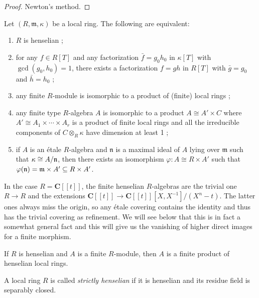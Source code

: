 \begin{proof}
Newton's method.
\end{proof}

\begin{theorem}
\label{theorem-heselian}
Let $(R, \mathfrak m, \kappa)$ be a local ring. The following are equivalent:
\begin{enumerate}
\item $R$ is henselian ;
\item for any $f\in R[T]$ and any factorization $\bar f = g_0 h_0$ in 
$\kappa[T]$ with $\gcd(g_0,h_0)=1$, there exists a factorization $f=gh$ in 
$R[T]$ with $\bar g = g_0$ and $\bar h=h_0$ ;
\item any finite $R$-module is isomorphic to a product of (finite) local rings ;
\item any finite type $R$-algebra $A$ is isomorphic to a product $A \cong A' 
\times C$ where $A' \cong A_1 \times \cdots \times A_r$ is a product of finite 
local rings and all the irreducible components of $C\otimes_R\kappa$ have 
dimension at least 1 ;
\item if $A$ is an \'etale $R$-algebra and $\mathfrak n$ is a maximal ideal of 
$A$ lying over $\mathfrak m$ such that $\kappa \cong A/\frak n$, then there 
exists an isomorphism $\varphi: A \cong R\times A'$ such that $\varphi(\frak n) 
= \frak m \times A'\subseteq R\times A'$.
\end{enumerate}
\end{theorem}

\begin{example}
\label{example-powerseries}
In the case $R = \mathbf{C}[[t]]$, the finite henselian $R$-algebras are the 
trivial one $R \to R$ and the extensions
$\mathbf{C}[[t]] \to \mathbf{C}[[t]][X, X^{-1}]/(X^n-t)$.
The latter ones always miss the origin, so any 
\'etale covering contains the identity and thus has the trivial covering as 
refinement. We will see below that this is in fact a somewhat general fact and 
this will give us the vanishing of higher direct images for a finite morphism.
\end{example}

\begin{lemma}
\label{lemma-finite-over-henselian}
If $R$ is henselian and $A$ is a finite $R$-module, then $A$ is a finite 
product of henselian local rings. 
\end{lemma}

\begin{definition}
\label{definition-strictly-henselian}
A local ring $R$ is called {\it strictly henselian} if it is henselian and its 
residue field is separably closed. 
\end{definition}

